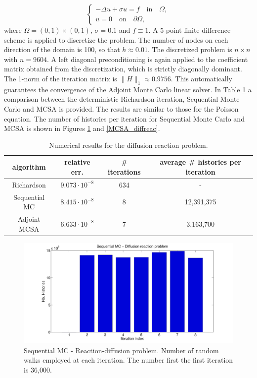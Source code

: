 \documentclass[times]{nlaauth}
\begin{document}
\begin{equation}
\begin{cases}
 -\Delta u +\sigma u= f \quad \text{in}\quad \Omega, \\
 u=0\quad \text{on} \quad \partial\Omega,
 \end{cases}
\end{equation}
where $\Omega=(0,1)\times (0,1)$, $\sigma=0.1$ and $f\equiv 1$.
A 5-point finite difference scheme is applied to discretize the problem.
The number of nodes
on each direction of the domain is 100, so that $h\approx 0.01$. The
discretized problem is $n\times n$ with $n=9604$. A left
diagonal preconditioning is again applied to
the coefficient matrix obtained from the discretization, which
is strictly diagonally dominant. The 1-norm of the
iteration matrix is $\lVert H\rVert_1\approx 0.9756$. This automatically
guarantees the convergence of the Adjoint Monte Carlo linear solver.
In Table \ref{DR_results} a comparison between the deterministic
Richardson iteration, Sequential Monte Carlo and MCSA is provided.
The results are similar to those for the Poisson equation.
The number of histories per iteration for Sequential Monte Carlo and MCSA
is shown in Figures \ref{SEQ_diffreac} and \ref{MCSA_diffreac}.

\begin{table}[!t]
\centering
\hspace*{-0.8cm}
\begin{tabular}{|c|c|c|c|}
\hline
algorithm & relative err.& \# iterations & average \# histories per iteration\\
\hline
 Richardson & $9.073\cdot 10^{-8}$ & 634 & - \\
\hline
 Sequential MC & $8.415 \cdot 10^{-8}$ &  8 & 12,391,375\\
 \hline
 Adjoint MCSA & $6.633 \cdot 10^{-8}$ &  7 & 3,163,700\\
\hline
\end{tabular}
\caption{Numerical results for the diffusion reaction problem.}
\label{DR_results}
\end{table}

\begin{figure}
  \centering
    \includegraphics[width=\textwidth]{MC_graphs/SEQ_diffreac}
      \caption{Sequential MC - Reaction-diffusion problem. Number of random
walks
employed at each
 iteration. The number first the first iteration is 36,000.}
\label{SEQ_diffreac}
\end{figure}
\end{document}
